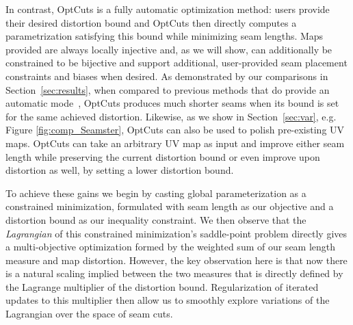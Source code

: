 In contrast, OptCuts is a fully automatic optimization method: users provide their desired distortion bound and OptCuts then directly computes a parametrization satisfying this bound while minimizing seam lengths.  Maps provided are always locally injective and, as we will show, can additionally be constrained to be bijective and support additional, user-provided seam placement constraints and biases when desired. %
As demonstrated by our comparisons in Section~\ref{sec:results},
when compared to previous methods that do provide an automatic mode~\cite{BoundedDistortParam:2002,Poranne2017Autocuts}, OptCuts produces much shorter seams when its bound is set for the same achieved distortion. 
Likewise, as we show in Section~\ref{sec:var}, e.g. Figure \ref{fig:comp_Seamster}, OptCuts can also be used to polish pre-existing UV maps. 
OptCuts can take an arbitrary UV map as input and improve either seam length while preserving the current distortion bound or even improve upon distortion as well, by setting a lower distortion bound.

  To achieve these gains we begin by casting global parameterization as a constrained minimization, formulated with seam length as our objective and a distortion bound as our inequality constraint. We then observe that the \emph{Lagrangian} of this constrained minimization's saddle-point problem directly gives a multi-objective optimization formed by the weighted sum of our seam length measure and map distortion. However, the key observation here is that now there is a natural scaling implied between the two measures that is directly defined by the Lagrange multiplier of the distortion bound. Regularization of iterated updates to this multiplier then allow us to smoothly explore variations of the Lagrangian over the space of seam cuts. 
  
